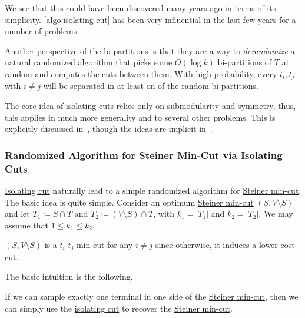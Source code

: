 We see that this could have been discovered many years ago in terms of its simplicity. \autoref{algo:isolating-cut} has been very influential in the last few years for a number of problems.

\begin{note}
	Another perspective of the bi-partitions is that they are a way to \emph{derandomize} a natural randomized algorithm that picks some \(O(\log k)\) bi-partitions of \(T\) at random and computes the cuts between them. With high probability, every \(t_i, t_j\) with \(i \neq j\) will be separated in at least on of the random bi-partitions.
\end{note}

\begin{remark}
	The core idea of \hyperref[prb:isolating-cut]{isolating cuts} relies only on \hyperref[def:submodular]{submodularity} and symmetry, thus, this applies in much more generality and to several other problems. This is explicitly discussed in~\cite{chekuri2021isolating}, though the ideas are implicit in~\cite{li2020deterministic}.
\end{remark}

\subsubsection{Randomized Algorithm for Steiner Min-Cut via Isolating Cuts}
\hyperref[prb:isolating-cut]{Isolating cut} naturally lead to a simple randomized algorithm for \hyperref[prb:Steiner-min-cut]{Steiner min-cut}. The basic idea is quite simple. Consider an optimum \hyperref[prb:Steiner-min-cut]{Steiner min-cut} \((S, V\setminus S)\) and let \(T_1 \coloneqq S \cap T\) and \(T_2 \coloneqq (V \setminus S) \cap T\), with \(k_1 = \lvert T_1 \rvert \) and \(k_2 = \lvert T_2 \rvert \). We may assume that \(1 \leq k_1 \leq k_2\).

\begin{note}
	\((S, V\setminus S)\) is a \hyperref[prb:s-t-min-cut]{\(t_i\)-\(t_j\) min-cut} for any \(i \neq j\) since otherwise, it induces a lower-cost cut.
\end{note}

The basic intuition is the following.

\begin{intuition}
	If we can sample exactly one terminal in one side of the \hyperref[prb:Steiner-min-cut]{Steiner min-cut}, then we can simply use the \hyperref[prb:isolating-cut]{isolating cut} to recover the \hyperref[prb:Steiner-min-cut]{Steiner min-cut}.
\end{intuition}

